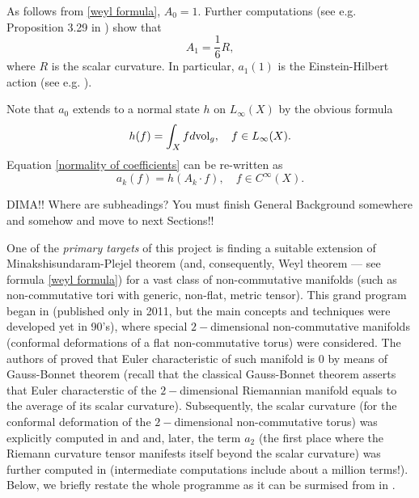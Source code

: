 \documentclass{article}
\begin{document}
As follows from \eqref{weyl formula}, $A_0=1.$ Further computations (see e.g. Proposition 3.29 in \cite{Rosenberg}) show that
$$A_1=\frac16 R,$$
where $R$ is the scalar curvature. In particular, $a_1(1)$ is the Einstein-Hilbert action (see e.g. \cite{Connes-book}{\color{red})}.

Note that $a_0$ extends to a normal state $h$ on $L_{\infty}(X)$ by the obvious formula
$$h(f)=\int_X fd{\rm vol}_g,\quad f\in L_{\infty}(X).$$
Equation \eqref{normality of coefficients} can be re-written as
$$a_k(f)=h(A_k\cdot f),\quad f\in C^{\infty}(X).$$

{\color{red} DIMA!! Where are subheadings? You must finish General Background somewhere and somehow and move to next Sections!!}


One of the {\it primary targets} of this project is finding a suitable extension of Minakshisundaram-Plejel theorem (and, consequently, Weyl theorem --- see formula \eqref{weyl formula}) for a vast class of non-commutative manifolds (such as non-commutative tori with generic, non-flat, metric tensor). This grand program began in \cite{ConnesTretkoff} (published only in 2011, but the main concepts and techniques were developed yet in 90's), where special $2-$dimensional non-commutative manifolds (conformal deformations of a flat non-commutative torus) were considered. The authors of \cite{ConnesTretkoff} proved that Euler characteristic of such manifold is $0$ by means of Gauss-Bonnet theorem (recall that the classical Gauss-Bonnet theorem asserts that Euler characterstic of the $2-$dimensional Riemannian manifold equals to the average of its scalar curvature). Subsequently, the scalar curvature (for the conformal deformation of the $2-$dimensional non-commutative torus) was explicitly computed in \cite{ConnesMoscovici_curvature} and \cite{FathizadehKhalkhali} and, later, the term $a_2$ (the first place where the Riemann curvature tensor manifests itself beyond the scalar curvature) was further computed in \cite{ConnesFathizadeh} (intermediate computations include about a million terms!). Below, we briefly restate the whole programme as it can be surmised from in \cite{ConnesTretkoff}.


\end{document}
